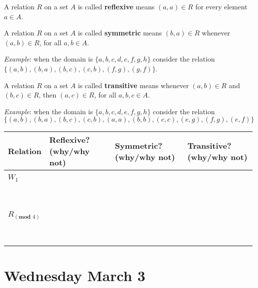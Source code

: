 \documentclass[12pt, oneside]{article}
\begin{document}
\vfill
\newpage

A relation $R$ on a set $A$ is called {\bf reflexive} means $(a, a) \in R$ for every element $a \in A$. 


\vfill

A relation $R$ on a set $A$ is called {\bf symmetric} means $(b, a) \in R$ whenever $(a, b) \in R$, for all $a, b \in A$. 

{\it Example}: when the domain is $\{ a,b,c,d,e,f,g,h\}$ consider the relation $\{ (a,b), (b,a), (b,c), (c,b),(f,g), (g,f) \}$.

\vfill




A relation $R$ on a set $A$ is called {\bf transitive} means whenever $(a, b) \in R$ and $(b, c) \in R$, then $(a, c) \in R$, for all $a, b, c \in A$.

{\it Example}: when the domain is $\{ a,b,c,d,e,f,g,h\}$ consider the relation 
$$\{ (a,b), (b,a), (b,c), (c,b), (a,a), (b,b), (c,c), (e,g), (f,g), (e,f) \}$$

\vfill


\begin{tabular}{|l|l|l|l|}
    \hline
    Relation & Reflexive? (why/why not) & Symmetric? (why/why not) & Transitive? (why/why not) \\
    \hline
    &&&\\
    $W_1$ & & &  \\
    &&&\\ &&&\\
    &&&\\ &&&\\
    &&&\\ &&&\\
    &&&\\ &&&\\
    \hline
    &&&\\ 
    $R_{(\textbf{mod } 4)}$ & & & \\
    &&&\\ &&&\\
    &&&\\ &&&\\
    &&&\\ &&&\\
    &&&\\ &&&\\
    \hline
\end{tabular}

\newpage
\section*{Wednesday March 3}
\end{document}
